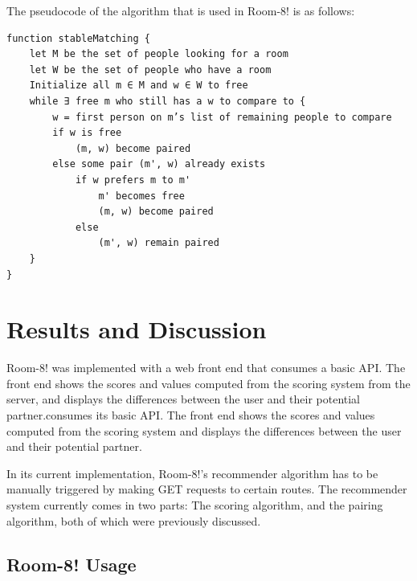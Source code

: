 \documentclass[journal]{./IEEE/IEEEtran}
\begin{document}
The pseudocode of the algorithm that is used in Room-8! is as follows:
\newpage
\begin{verbatim}
function stableMatching {
    let M be the set of people looking for a room
    let W be the set of people who have a room
    Initialize all m ∈ M and w ∈ W to free
    while ∃ free m who still has a w to compare to {
        w = first person on m’s list of remaining people to compare
        if w is free
            (m, w) become paired
        else some pair (m', w) already exists
            if w prefers m to m'
                m' becomes free
                (m, w) become paired
            else
                (m', w) remain paired
    }
}
\end{verbatim}


\section{Results and Discussion}
Room-8! was implemented with a web front end that consumes a basic API. The front end shows the scores and values
computed from the scoring system from the server, and displays the differences between the user and their potential
partner.consumes its basic API. The front end shows the scores and values computed from the scoring system and displays
the differences between the user and their potential partner.

In its current implementation, Room-8!'s recommender algorithm has to be manually triggered by making GET requests to
certain routes. The recommender system currently comes in two parts: The scoring algorithm, and the pairing algorithm,
both of which were previously discussed.

    \subsection{Room-8! Usage}
\end{document}
